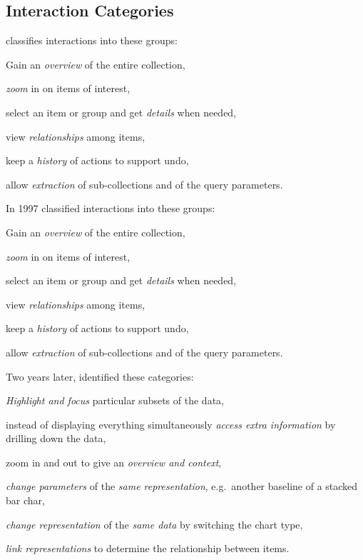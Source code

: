 \subsection{Interaction Categories}\label{sec:related-work:categories}
\textcite{Shneiderman1996} classifies interactions into these groups:
\begin{enumerate*}[label=(\arabic*)]
  \item
    Gain an \emph{overview} of the entire collection,
  \item
    \emph{zoom} in on items of interest,
  \item
    select an item or group and get \emph{details} when needed,
  \item
    view \emph{relationships} among items,
  \item
    keep a \emph{history} of actions to support undo,
  \item
    allow \emph{extraction} of sub-collections and of the query parameters.
\end{enumerate*}

In 1997 \textcite{Shneiderman1996} classified interactions into these groups:
\begin{enumerate*}[label=(\arabic*)]
  \item
    Gain an \emph{overview} of the entire collection,
  \item
    \emph{zoom} in on items of interest,
  \item
    select an item or group and get \emph{details} when needed,
  \item
    view \emph{relationships} among items,
  \item
    keep a \emph{history} of actions to support undo,
  \item
    allow \emph{extraction} of sub-collections and of the query parameters.
\end{enumerate*}

Two years later, \textcite{Dix1998} identified these categories:
\begin{enumerate*}[label=(\arabic*)]
  \item
    \emph{Highlight and focus} particular subsets of the data,
  \item
    instead of displaying everything simultaneously \emph{access extra information} by drilling down the data,
  \item
    zoom in and out to give an \emph{overview and context},
  \item
    \emph{change parameters} of the \emph{same representation}, e.g.\ another baseline of a stacked bar char,
  \item
    \emph{change representation} of the \emph{same data} by switching the chart type,
  \item
    \emph{link representations} to determine the relationship between items.
\end{enumerate*}

